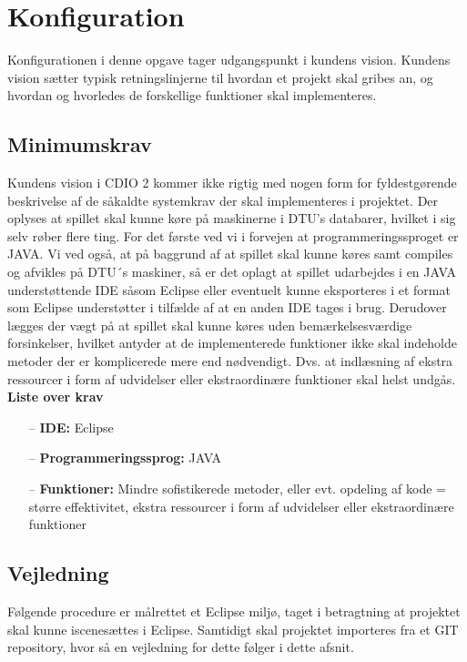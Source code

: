 \chapter{Konfiguration}

Konfigurationen i denne opgave tager udgangspunkt i kundens vision. Kundens vision sætter typisk retningslinjerne til hvordan et projekt skal gribes an, og hvordan og hvorledes de forskellige funktioner skal implementeres.

\section{Minimumskrav}

Kundens vision i CDIO 2 kommer ikke rigtig med nogen form for fyldestgørende beskrivelse af de såkaldte systemkrav der skal implementeres i projektet. Der oplyses at spillet skal kunne køre på maskinerne i DTU’s databarer, hvilket i sig selv røber flere ting. For det første ved vi i forvejen at programmeringssproget er JAVA. Vi ved også, at på baggrund af at spillet skal kunne køres samt compiles og afvikles på DTU´s maskiner, så er det oplagt at spillet udarbejdes i en JAVA understøttende IDE såsom Eclipse eller eventuelt kunne eksporteres i et format som Eclipse understøtter i tilfælde af at en anden IDE tages i brug. Derudover lægges der vægt på at spillet skal kunne køres uden bemærkelsesværdige forsinkelser, hvilket antyder at de implementerede funktioner ikke skal indeholde metoder der er komplicerede mere end nødvendigt. Dvs. at indlæsning af ekstra ressourcer i form af udvidelser eller ekstraordinære funktioner skal helst undgås.\\

\noindent \textbf{Liste over krav}
\begin{itemize}
    \item[--] \textbf{IDE:} Eclipse
    \item[--] \textbf{Programmeringssprog:} JAVA
    \item[--] \textbf{Funktioner:} Mindre sofistikerede metoder, eller evt. opdeling af kode = større effektivitet, ekstra ressourcer i form af udvidelser eller ekstraordinære funktioner
\end{itemize}

\section{Vejledning}

Følgende procedure er målrettet et Eclipse miljø, taget i betragtning at projektet skal kunne iscenesættes i Eclipse. Samtidigt skal projektet importeres fra et GIT repository, hvor så en vejledning for dette følger i dette afsnit.\\

